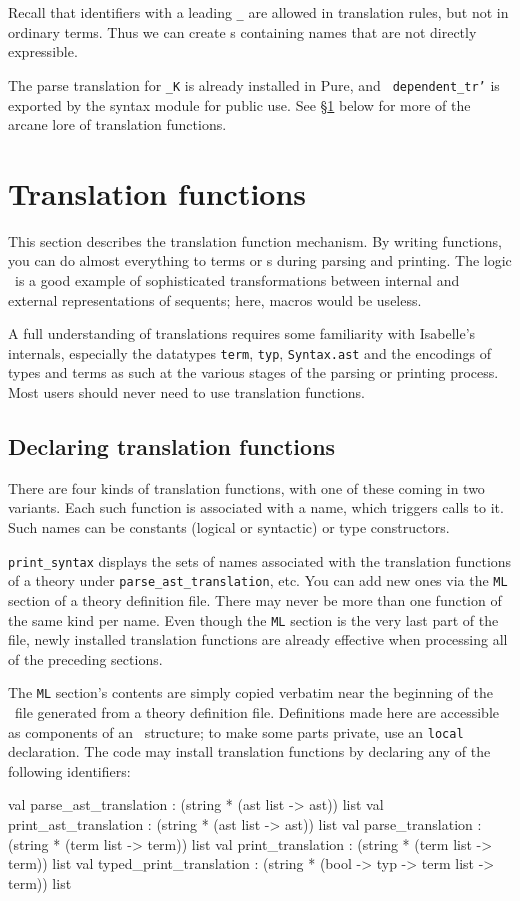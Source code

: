 Recall that identifiers with a leading {\tt _} are allowed in translation
rules, but not in ordinary terms.  Thus we can create \AST{}s containing
names that are not directly expressible.

The parse translation for {\tt _K} is already installed in Pure, and {\tt
dependent_tr'} is exported by the syntax module for public use.  See
\S\ref{sec:tr_funs} below for more of the arcane lore of translation functions.


\section{Translation functions} \label{sec:tr_funs}
%
This section describes the translation function mechanism.  By writing
\ML{} functions, you can do almost everything to terms or \AST{}s
during parsing and printing.  The logic \LK\ is a good example of
sophisticated transformations between internal and external
representations of sequents; here, macros would be useless.

A full understanding of translations requires some familiarity
with Isabelle's internals, especially the datatypes {\tt term}, {\tt typ},
{\tt Syntax.ast} and the encodings of types and terms as such at the various
stages of the parsing or printing process.  Most users should never need to
use translation functions.

\subsection{Declaring translation functions}
There are four kinds of translation functions, with one of these
coming in two variants.  Each such function is associated with a name,
which triggers calls to it.  Such names can be constants (logical or
syntactic) or type constructors.

{\tt print_syntax} displays the sets of names associated with the translation
functions of a theory under \texttt{parse_ast_translation}, etc.  You can add
new ones via the {\tt ML} section of a theory definition
file.  There may never be more than one function of the same kind per name.
Even though the {\tt ML} section is the very last part of the file, newly
installed translation functions are already effective when processing all of
the preceding sections.

The {\tt ML} section's contents are simply copied verbatim near the
beginning of the \ML\ file generated from a theory definition file.
Definitions made here are accessible as components of an \ML\ 
structure; to make some parts private, use an \ML{} {\tt local}
declaration.  The {\ML} code may install translation functions by
declaring any of the following identifiers:
\begin{ttbox}
val parse_ast_translation   : (string * (ast list -> ast)) list
val print_ast_translation   : (string * (ast list -> ast)) list
val parse_translation       : (string * (term list -> term)) list
val print_translation       : (string * (term list -> term)) list
val typed_print_translation :
    (string * (bool -> typ -> term list -> term)) list
\end{ttbox}

